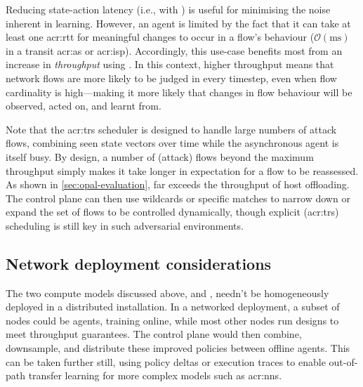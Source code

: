 
Reducing state-action latency (i.e., with \Coopfw) is useful for minimising the noise inherent in learning.
However, an agent is limited by the fact that it can take at least one \gls{acr:rtt} for meaningful changes to occur in a flow's behaviour ($\mathcal{O}{\left(\si{\milli\second}\right)}$ in a transit \gls{acr:as} or \gls{acr:isp}).
Accordingly, this use-case benefits most from an increase in \emph{throughput} using \Indfw{}.
In this context, higher throughput means that network flows are more likely to be judged in every timestep, even when flow cardinality is high---making it more likely that changes in flow behaviour will be observed, acted on, and learnt from.

Note that the \gls{acr:trs} scheduler is designed to handle large numbers of attack flows, combining seen state vectors over time while the asynchronous agent is itself busy.
By design, a number of (attack) flows beyond the maximum throughput simply makes it take longer in expectation for a flow to be reassessed.
As shown in \cref{sec:opal-evaluation}, \approachshort{} far exceeds the throughput of host offloading.
The control plane can then use wildcards or specific matches to narrow down or expand the set of flows to be controlled dynamically, though explicit (\gls{acr:trs}) scheduling is still key in such adversarial environments.


\subsection{Network deployment considerations}
The two compute models discussed above, \coopfw{} and \indfw{}, needn't be homogeneously deployed in a distributed installation.
In a networked deployment, a subset of \approachshort{} nodes could be \coopfw{} agents, training online, while most other nodes run \indfw{} designs to meet throughput guarantees.
The control plane would then combine, downsample, and distribute these improved policies between offline agents.
This can be taken further still, using policy deltas or execution traces to enable out-of-path transfer learning for more complex models such as \glspl{acr:nn}.